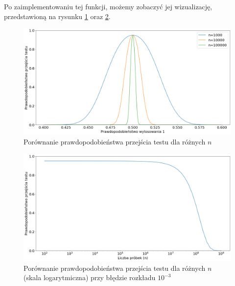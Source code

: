 Po zaimplementowaniu tej funkcji, możemy zobaczyć jej wizualizację, przedstawioną na rysunku \ref{fig:vis_1} oraz \ref{fig:vis_2}.
\begin{figure}[!htp]
    \centering
    \includegraphics[width=15cm]{chance_of_passing_test_for_n}
    \caption{Porównanie prawdopodobieństwa przejścia testu dla różnych $n$}
    \label{fig:vis_1}
\end{figure}
\begin{figure}[!htp]
    \centering
    \includegraphics[width=15cm]{probability_of_passing_test_log_scale}
    \caption{Porównanie prawdopodobieństwa przejścia testu dla różnych $n$ (skala logarytmiczna) przy błędzie rozkładu $10^{-3}$}
    \label{fig:vis_2}
\end{figure}
